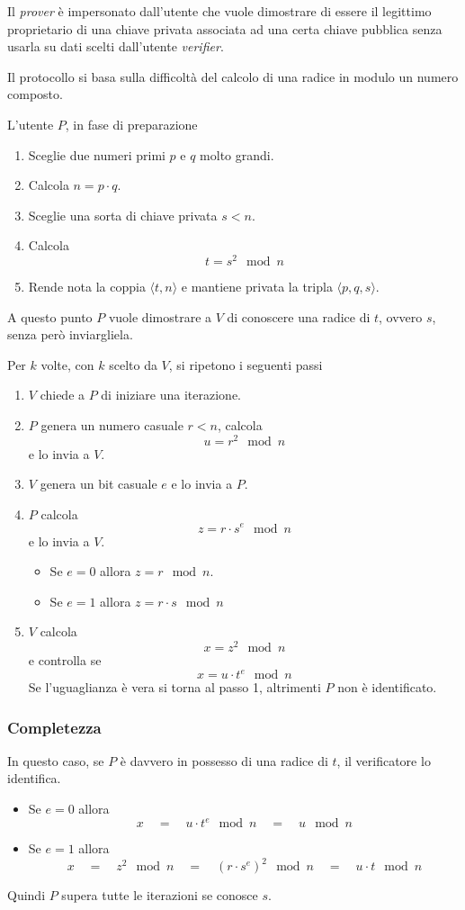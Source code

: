 Il \emph{prover} \`e impersonato dall'utente che vuole dimostrare di essere il legittimo proprietario di una chiave
privata associata ad una certa chiave pubblica senza usarla su dati scelti dall'utente \emph{verifier}.

Il protocollo si basa sulla difficolt\`a del calcolo di una radice in modulo un numero composto.

L'utente $P$, in fase di preparazione
\begin{enumerate}
	\item Sceglie due numeri primi $p$ e $q$ molto grandi.
	\item Calcola $n = p \cdot q$.
	\item Sceglie una sorta di chiave privata $s < n$.
	\item Calcola
	      \[ t = s^2 \mod{n} \]
	\item Rende nota la coppia $\langle t, n \rangle$ e mantiene privata la tripla $\langle p, q, s \rangle$.
\end{enumerate}
A questo punto $P$ vuole dimostrare a $V$ di conoscere una radice di $t$, ovvero $s$, senza per\`o inviargliela.

Per $k$ volte, con $k$ scelto da $V$, si ripetono i seguenti passi
\begin{enumerate}
	\item $V$ chiede a $P$ di iniziare una iterazione.
	\item $P$ genera un numero casuale $r < n$, calcola
	      \[ u = r^2 \mod{n} \]
	      e lo invia a $V$.
	\item $V$ genera un bit casuale $e$ e lo invia a $P$.
	\item $P$ calcola
	      \[ z = r \cdot s^e \mod{n} \]
	      e lo invia a $V$.
	      \begin{itemize}
		      \item Se $e = 0$ allora $z = r \mod{n}$.
		      \item Se $e = 1$ allora $z = r \cdot s \mod{n}$
	      \end{itemize}
	\item $V$ calcola
	      \[ x = z^2 \mod{n} \]
	      e controlla se
	      \[ x = u \cdot t^e \mod{n} \]
	      Se l'uguaglianza \`e vera si torna al passo 1, altrimenti $P$ non \`e identificato.
\end{enumerate}

\subsubsection{Completezza}
In questo caso, se $P$ \`e davvero in possesso di una radice di $t$, il verificatore lo identifica.
\begin{itemize}
	\item Se $e = 0$ allora
	      \[ x \quad = \quad u \cdot t^e \mod{n} \quad = \quad u \mod{n} \]
	\item Se $e = 1$ allora
	      \[ x \quad = \quad z^2 \mod{n} \quad = \quad (r \cdot s^e)^2 \mod{n} \quad = \quad u \cdot t \mod{n} \]
\end{itemize}
Quindi $P$ supera tutte le iterazioni se conosce $s$.

